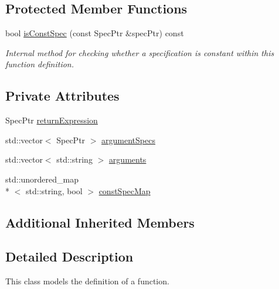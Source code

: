 \subsection*{Protected Member Functions}
\begin{DoxyCompactItemize}
\item 
bool \hyperlink{classgiskard__suturo_1_1FunctionDefinition_af94fa1fad76a909bb4512af9408fbcaf}{is\-Const\-Spec} (const Spec\-Ptr \&spec\-Ptr) const 
\begin{DoxyCompactList}\small\item\em Internal method for checking whether a specification is constant within this function definition. \end{DoxyCompactList}\end{DoxyCompactItemize}
\subsection*{Private Attributes}
\begin{DoxyCompactItemize}
\item 
Spec\-Ptr \hyperlink{classgiskard__suturo_1_1FunctionDefinition_a17ab4ec5dce5ba78f94917d88b434c29}{return\-Expression}
\item 
std\-::vector$<$ Spec\-Ptr $>$ \hyperlink{classgiskard__suturo_1_1FunctionDefinition_aca5605f42cc4324a219b2fe1d2f53043}{argument\-Specs}
\item 
std\-::vector$<$ std\-::string $>$ \hyperlink{classgiskard__suturo_1_1FunctionDefinition_a6e58c097c4e9e1c97522d394d03ca080}{arguments}
\item 
std\-::unordered\-\_\-map\\*
$<$ std\-::string, bool $>$ \hyperlink{classgiskard__suturo_1_1FunctionDefinition_a824d669129fe7829e3df3f4fd1a3fb9a}{const\-Spec\-Map}
\end{DoxyCompactItemize}
\subsection*{Additional Inherited Members}


\subsection{Detailed Description}
This class models the definition of a function. 

